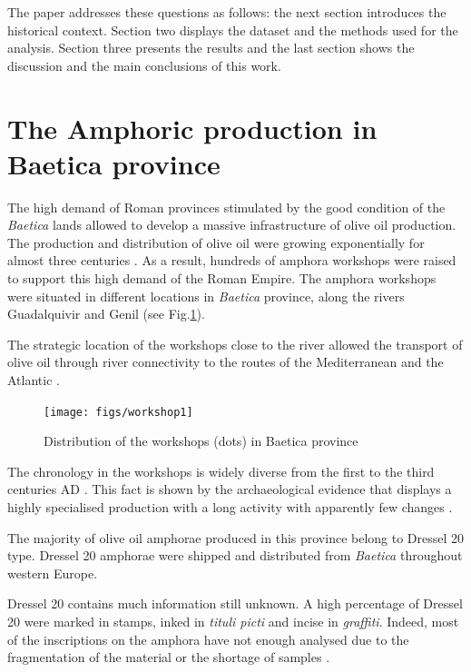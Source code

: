 \documentclass[review]{elsarticle}
\begin{document}
The paper addresses these questions as follows: the next section introduces the historical context. Section two displays the dataset and the methods used for the analysis. Section three presents the results and the last section shows the discussion and the main conclusions of this work. 


\section{The Amphoric production in Baetica province}

The high demand of Roman provinces stimulated by the good condition of the \textit{Baetica} lands allowed to develop a massive infrastructure of olive oil production. The production and distribution of olive oil were growing exponentially for almost three centuries \citep{remesal_concierto}. As a result, hundreds of amphora workshops were raised to support this high demand of the Roman Empire. The amphora workshops were situated in different locations in \textit{Baetica} province, along the rivers Guadalquivir and Genil (see Fig.\ref{workshop}).

The strategic location of the workshops close to the river allowed the transport of olive oil through river connectivity to the routes of the Mediterranean and the Atlantic \citep{garcia_vargas_enrique_formal_2010}.

\begin{figure}[htp]
	\centering
\texttt{[image: figs/workshop1]}
\caption{Distribution of the workshops (dots) in Baetica province}
\label{workshop}
\end{figure} 


The chronology in the workshops is widely diverse from the first to the third centuries AD \citep{millet_anforas_1998,rodriguez_baetican_1998,chic2005comercio}. 
This fact is shown by the archaeological evidence that displays a highly specialised production with a long activity with apparently few changes \citep{remesal_anforas_2004}.


The majority of olive oil amphorae produced in this province belong to Dressel 20 type\citep{dressel_ricerche_1878,
millet_anforas_1998}. Dressel 20 amphorae were shipped and distributed from \textit{Baetica} throughout western Europe. 

Dressel 20 contains much information still unknown. A high percentage of  Dressel 20 were marked in stamps, inked in \textit{tituli picti} and incise in \textit{graffiti}. Indeed, most of the inscriptions on the amphora have not enough analysed due to the fragmentation of the material or the shortage of samples \citep{aguilera_evolucion_2007,rovira_guardiola_grafitos_2007}. 
\end{document}

